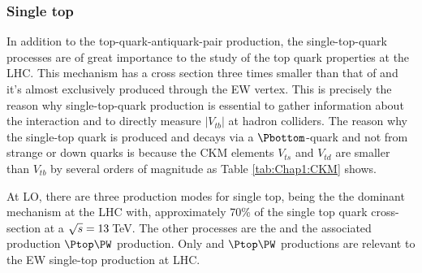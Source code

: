 


\subsubsection{Single top}
\label{sec:Chap1:Top:Production:SingleTop}
In addition to the top-quark-antiquark-pair production, the single-top-quark processes are of great 
importance to the study of the top quark properties at the LHC.  
This mechanism has a cross section three times smaller than that of \ttbar and  
it's almost exclusively produced through the EW \Wtb vertex.
This is precisely the reason why single-top-quark production is essential to gather 
information about the \Wtb interaction and to directly measure $|V_{tb}|$ at hadron colliders.
The reason why the single-top quark is produced and decays via a $\Pbottom$-quark
and not from strange 
or down quarks is because the CKM elements $V_{ts}$ and $V_{td}$ 
are smaller than $V_{tb}$  by several orders of magnitude 
as Table \ref{tab:Chap1:CKM} shows. %

At LO, there are three production modes for single top, being the \tchannel the dominant mechanism at the LHC 
with, approximately 70\% of  the single top quark cross-section at a $\sqrt{s}=13\,$TeV.  %
The other processes are the \schannel and the associated production $\Ptop\PW$ production. Only \tchannel and
$\Ptop\PW$ productions are relevant to the EW single-top production at LHC.%


